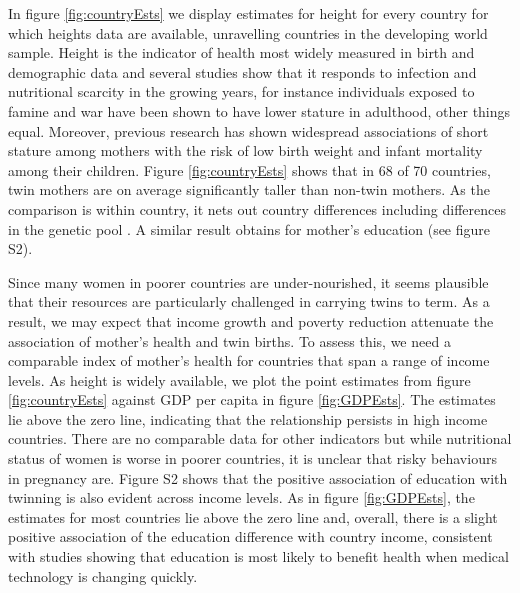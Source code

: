 \documentclass[11pt]{article}
\begin{document}
In figure \ref{fig:countryEsts} we display estimates for height for every country for which heights data are available, unravelling countries in the developing world sample. Height is the indicator of health most widely measured in birth and demographic data and several studies show that it responds to infection and nutritional scarcity in the growing years, for instance individuals exposed to famine and war have been shown to have lower stature in adulthood, other things equal\cite{Silventoinen2003,Bozzolietal2009,Wangetal2010,Akreshetal2012}. Moreover, previous research has shown widespread associations of short stature among mothers with the risk of low birth weight and infant mortality among their children\cite{BhalotraRawlings2013}.  Figure \ref{fig:countryEsts} shows that in 68 of 70 countries, twin mothers are on average significantly taller than non-twin mothers. As the comparison is within country, it nets out country differences including differences in the genetic pool \cite{Deaton2007}. A similar result obtains for mother's education\cite{Kenkel1991,CutlerLlerasMuney2010} (see figure S2).

Since many women in poorer countries are under-nourished, it seems plausible that their resources are particularly challenged in carrying twins to term. As a result, we may expect that income growth and poverty reduction attenuate the association of mother's health and twin births. To assess this, we need a comparable index of mother's health for countries that span a range of income levels. As height is widely available, we plot the point estimates from figure \ref{fig:countryEsts} against GDP per capita in figure \ref{fig:GDPEsts}. The estimates lie above the zero line, indicating that the relationship persists in high income countries. There are no comparable data for other indicators but while nutritional status of women is worse in poorer countries, it is unclear that risky behaviours in pregnancy are.  Figure S2 shows that the positive association of education with twinning is also evident across income levels. As in figure \ref{fig:GDPEsts}, the estimates for most countries lie above the zero line and, overall, there is a slight positive association of the education difference with country income, consistent with studies showing that education is most likely to benefit health when medical technology is changing quickly\cite{LlerasMuneyGlied2008}.
\end{document}

